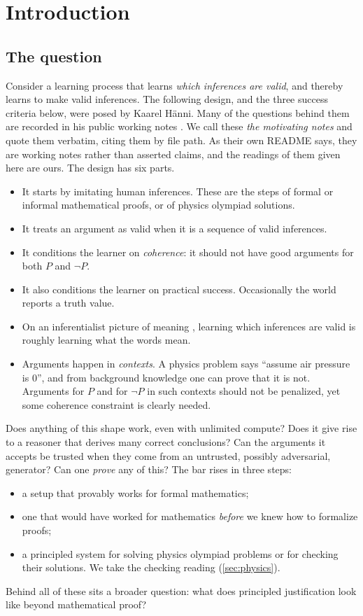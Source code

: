 \section{Introduction}\label{sec:intro}

\subsection{The question}\label{sec:intro:question}

Consider a learning process that learns \emph{which inferences are valid}, and thereby learns to make valid inferences. The following design, and the three success criteria below, were posed by Kaarel H\"anni. Many of the questions behind them are recorded in his public working notes \citep{hanni2026notes}. We call these \emph{the motivating notes} and quote them verbatim, citing them by file path. As their own README says, they are working notes rather than asserted claims, and the readings of them given here are ours. The design has six parts.
\begin{itemize}
\item It starts by imitating human inferences. These are the steps of formal or informal mathematical proofs, or of physics olympiad solutions.
\item It treats an argument as valid when it is a sequence of valid inferences.
\item It conditions the learner on \emph{coherence}: it should not have good arguments for both $P$ and $\neg P$.
\item It also conditions the learner on practical success. Occasionally the world reports a truth value.
\item On an inferentialist picture of meaning \citep{brandom1994making}, learning which inferences are valid is roughly learning what the words mean.
\item Arguments happen in \emph{contexts}. A physics problem says ``assume air pressure is $0$'', and from background knowledge one can prove that it is not. Arguments for $P$ and for $\neg P$ in such contexts should not be penalized, yet some coherence constraint is clearly needed.
\end{itemize}
Does anything of this shape work, even with unlimited compute? Does it give rise to a reasoner that derives many correct conclusions? Can the arguments it accepts be trusted when they come from an untrusted, possibly adversarial, generator? Can one \emph{prove} any of this? The bar rises in three steps:
\begin{itemize}
\item a setup that provably works for formal mathematics;
\item one that would have worked for mathematics \emph{before} we knew how to formalize proofs;
\item a principled system for solving physics olympiad problems or for checking their solutions. We take the checking reading (\cref{sec:physics}).
\end{itemize}
Behind all of these sits a broader question: what does principled justification look like beyond mathematical proof?

